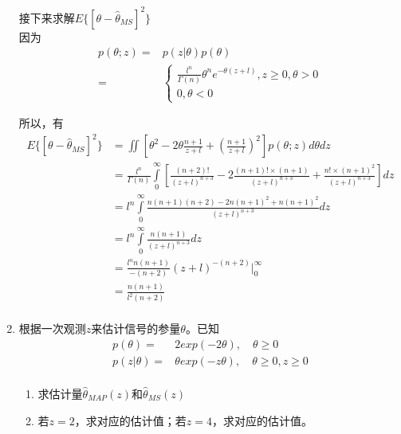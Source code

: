 \documentclass{article}
\begin{document}
\begin{enumerate}[1.]
接下来求解\(E\{ {[\theta  - {{\hat \theta }_{MS}}]^2}\} \)\\
因为
\begin{equation*}
\begin{split}
p(\theta ;z) =& p(z|\theta )p(\theta )\\
 =& \left\{ {\begin{array}{*{20}{c}}
{\frac{{{l^n}}}{{\Gamma (n)}}{\theta ^n}{e^{ - \theta (z + l)}},z \ge 0,\theta  > 0}\\
{0,\theta  < 0}
\end{array}} \right.
\end{split}
\end{equation*}

所以，有
\[\begin{aligned}
  E\{{{[\theta -{{{\hat{\theta }}}_{MS}}]}^{2}}\}
  &=\iint{\left[ {{\theta }^{2}}-2\theta \frac{n+1}{z+l}+{{\left( \frac{n+1}{z+l} \right)}^{2}} \right]p(\theta ;z)d\theta dz} \\ 
 & =\frac{{{l}^{n}}}{\Gamma (n)}\int\limits_{0}^{\infty }{\left[ \frac{(n+2)!}{{{(z+l)}^{n+3}}}-2\frac{(n+1)!\times (n+1)}{{{(z+l)}^{n+3}}}+\frac{n!\times {{(n+1)}^{2}}}{{{(z+l)}^{n+3}}} \right]dz} \\ 
 & ={{l}^{n}}\int\limits_{0}^{\infty }{\frac{n(n+1)(n+2)-2n{{(n+1)}^{2}}+n{{(n+1)}^{2}}}{{{(z+l)}^{n+3}}}dz} \\ 
 & ={{l}^{n}}\int\limits_{0}^{\infty }{\frac{n(n+1)}{{{(z+l)}^{n+3}}}dz} \\ 
 & =\frac{{{l}^{n}}n(n+1)}{-(n+2)}{{(z+l)}^{-(n+2)}}|_{0}^{\infty } \\ 
 & =\frac{n(n+1)}{{{l}^{2}}(n+2)} \\ 
\end{aligned}\]

\item 
根据一次观测\(z\)来估计信号的参量\(\theta\)。已知\\
$$
\begin{aligned}
p(\theta)=&2exp(-2\theta), \quad \theta \ge 0\\
p(z|\theta)=&\theta exp(-z\theta), \quad \theta \ge 0,z\ge 0\\
\end{aligned}
$$

\begin{enumerate}[(1)]
\item
求估计量\({{\hat \theta }_{MAP}}(z)\)和\({{\hat \theta }_{MS}}(z)\)
\item
若\(z=2\)，求对应的估计值；若\(z=4\)，求对应的估计值。
\end{enumerate}


\end{enumerate}
\end{document}
